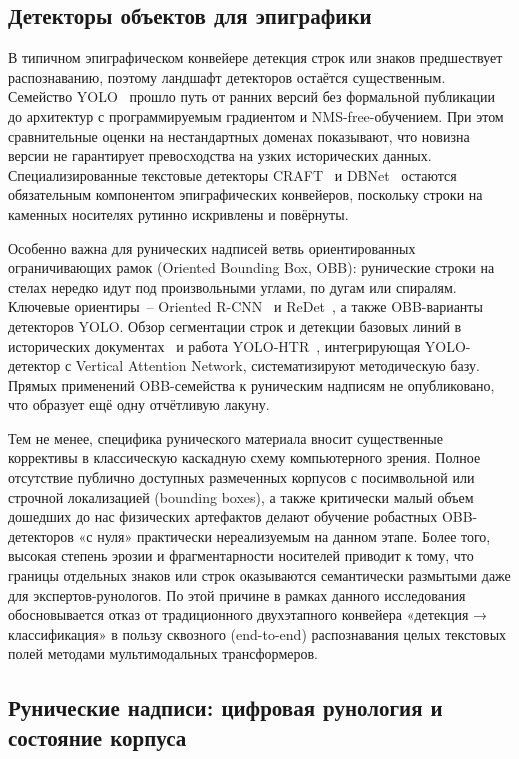 \documentclass[a4paper,12pt]{extarticle}
\begin{document}
\subsection{Детекторы объектов для эпиграфики}
\label{sec:lit-detect}

В типичном эпиграфическом конвейере детекция строк или знаков предшествует распознаванию, поэтому ландшафт детекторов остаётся существенным. Семейство YOLO~\cite{jocher2020,wang2024yolov9} прошло путь от ранних версий без формальной публикации до архитектур с программируемым градиентом и NMS-free-обучением. При этом сравнительные оценки на нестандартных доменах показывают, что новизна версии не гарантирует превосходства на узких исторических данных. Специализированные текстовые детекторы CRAFT~\cite{baek2019craft} и DBNet~\cite{liao2020dbnet} остаются обязательным компонентом эпиграфических конвейеров, поскольку строки на каменных носителях рутинно искривлены и повёрнуты.

Особенно важна для рунических надписей ветвь ориентированных ограничивающих рамок (Oriented Bounding Box, OBB): рунические строки на стелах нередко идут под произвольными углами, по дугам или спиралям. Ключевые ориентиры~-- Oriented R-CNN~\cite{xie2021orientedrcnn} и ReDet~\cite{han2021redet}, а также OBB-варианты детекторов YOLO. Обзор сегментации строк и детекции базовых линий в исторических документах~\cite{brodic2025} и работа YOLO-HTR~\cite{lomov2025}, интегрирующая YOLO-детектор с Vertical Attention Network, систематизируют методическую базу. Прямых применений OBB-семейства к руническим надписям не опубликовано, что образует ещё одну отчётливую лакуну.

Тем не менее, специфика рунического материала вносит существенные коррективы в классическую каскадную схему компьютерного зрения. Полное отсутствие публично доступных размеченных корпусов с посимвольной или строчной локализацией (bounding boxes), а также критически малый объем дошедших до нас физических артефактов делают обучение робастных OBB-детекторов «с нуля» практически нереализуемым на данном этапе. Более того, высокая степень эрозии и фрагментарности носителей приводит к тому, что границы отдельных знаков или строк оказываются семантически размытыми даже для экспертов-рунологов. По этой причине в рамках данного исследования обосновывается отказ от традиционного двухэтапного конвейера «детекция → классификация» в пользу сквозного (end-to-end) распознавания целых текстовых полей методами мультимодальных трансформеров. 

\subsection{Рунические надписи: цифровая рунология и состояние корпуса}
\label{sec:lit-runic}
\end{document}
